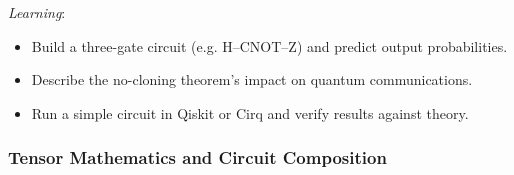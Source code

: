\emph{Learning}:
\begin{itemize}
	\item Build a three-gate circuit (e.g. H–CNOT–Z) and predict output probabilities.
	\item Describe the no-cloning theorem's impact on quantum communications.
	\item Run a simple circuit in Qiskit or Cirq and verify results against theory.
\end{itemize}





\subsubsection{Tensor Mathematics and Circuit Composition}

